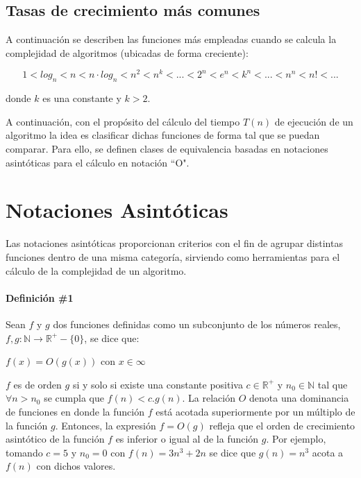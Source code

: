\subsection{Tasas de crecimiento más comunes} \label{lb:tasa}
 
A continuación se describen las funciones más empleadas cuando se calcula la complejidad de algoritmos (ubicadas de forma creciente):

$$1 < log_n < n < n \cdot log_n < n^2 < n^k < ... < 2^n < e^n < k^n < ... < n^n < n! < ...$$

\noindent donde $k$ es una constante y $k > 2$.

A continuación, con el propósito del cálculo del tiempo $T(n)$ de ejecución de un algoritmo la idea es clasificar dichas funciones de forma tal que se puedan comparar. Para ello, se definen clases de equivalencia basadas en notaciones asintóticas para el cálculo en notación ``O".

\section{Notaciones Asintóticas}

Las notaciones asintóticas proporcionan criterios con el fin de agrupar distintas funciones dentro de una misma categoría, sirviendo como herramientas para el cálculo de la complejidad de un algoritmo.

\paragraph{Definición \#1}

Sean $f$ y $g$ dos funciones definidas como un subconjunto de los números reales, $f,g:\mathbb{N} \to \mathbb{R}^+-\{0\}$, se dice que:

$f(x) = O(g(x))$ con $x \in \infty$

$f$ es de orden $g$ si y solo si existe una constante positiva $c \in \mathbb{R}^+$ y $n_0 \in \mathbb{N}$ tal que $\forall n > n_0$ se cumpla que $f(n) < c.g(n)$. La relación $O$ denota una dominancia de funciones en donde la función $f$ está acotada superiormente por un múltiplo de la función $g$. Entonces, la expresión $f=O(g)$ refleja que el orden de crecimiento asintótico de la función $f$ es inferior o igual al de la función $g$. Por ejemplo, tomando $c=5$ y $n_0 = 0$ con $f(n) = 3n^3 + 2n$ se dice que $g(n) = n^3$ acota a $f(n)$ con dichos valores.

